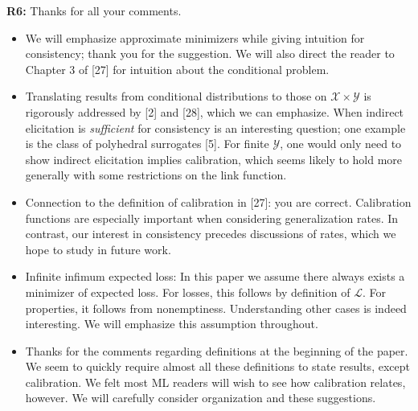 \documentclass{article}
\newcommand{\X}{\mathcal{X}}
\newcommand{\Y}{\mathcal{Y}}
\begin{document}
\textbf{R6:} Thanks for all your comments.
\begin{itemize}[itemsep=1pt,topsep=0pt]
\item 
We will emphasize approximate minimizers while giving intuition for consistency; thank you for the suggestion.  We will also direct the reader to Chapter 3 of [27] for intuition about the conditional problem.

\item 
Translating results from conditional distributions to those on $\X \times \Y$ is rigorously addressed by [2] and [28], which we can emphasize. When indirect elicitation is \emph{sufficient} for consistency is an interesting question; one example is the class of polyhedral surrogates [5]. For finite $\Y$, one would only need to show indirect elicitation implies calibration, which seems likely to hold more generally with some restrictions on the link function.

\item 
Connection to the definition of calibration in [27]: you are correct. Calibration functions are especially important when considering generalization rates. In contrast, our interest in consistency precedes discussions of rates, which we hope to study in future work.

\item 
Infinite infimum expected loss: In this paper we assume there always exists a minimizer of expected loss. For losses, this follows by definition of $\mathcal{L}$. For properties, it follows from nonemptiness. Understanding other cases is indeed interesting. We will emphasize this assumption throughout.

\item 
Thanks for the comments regarding definitions at the beginning of the paper. We seem to quickly require almost all these definitions to state results, except calibration. We felt most ML readers will wish to see how calibration relates, however.  We will carefully consider organization and these suggestions.
\end{itemize}
\end{document}
